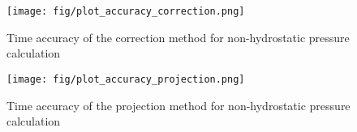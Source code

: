 \documentclass[12pt]{article}
\begin{document}
	\begin{figure}[htb]
		\begin{center}
			\texttt{[image: fig/plot\_accuracy\_correction.png]}
			\caption{Time accuracy of the correction method for non-hydrostatic pressure calculation}
			\label{fig:plot_accuracy_correction}
		\end{center}
	\end{figure}
	
	\begin{figure}[htb]
		\begin{center}
			\texttt{[image: fig/plot\_accuracy\_projection.png]}
			\caption{Time accuracy of the projection method for non-hydrostatic pressure calculation}
			\label{fig:plot_accuracy_projection}
		\end{center}
	\end{figure}
\end{document}
